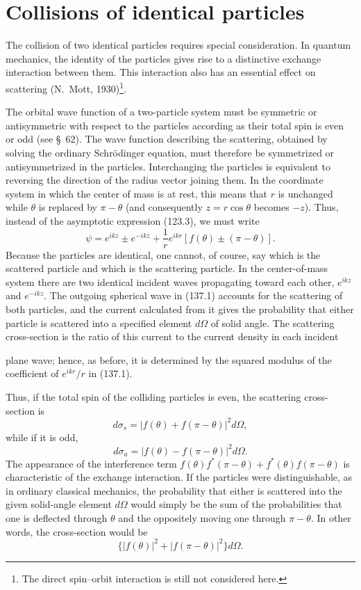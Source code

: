 \section{Collisions of identical particles}

The collision of two identical particles requires special consideration. In
quantum mechanics, the identity of the particles gives rise to a distinctive
exchange interaction between them. This interaction also has an essential
effect on scattering (N.~Mott, 1930)\footnote{The direct spin--orbit
interaction is still not considered here.}.

The orbital wave function of a two-particle system must be symmetric or
antisymmetric with respect to the particles according as their total spin is
even or odd (see \S~62). The wave function describing the scattering, obtained
by solving the ordinary Schrödinger equation, must therefore be symmetrized or
antisymmetrized in the particles. Interchanging the particles is equivalent
to reversing the direction of the radius vector joining them. In the
coordinate system in which the center of mass is at rest, this means that $r$
is unchanged while $\theta$ is replaced by $\pi-\theta$ (and consequently
$z=r\cos\theta$ becomes $-z$). Thus, instead of the asymptotic expression
(123.3), we must write
\begin{equation}
 \psi=e^{ikz}\pm e^{-ikz}+\frac1r e^{ikr}[f(\theta)\pm(\pi-\theta)].
 \tag{137.1}
\end{equation}
Because the particles are identical, one cannot, of course, say which is the
scattered particle and which is the scattering particle. In the center-of-mass
system there are two identical incident waves propagating toward each other,
$e^{ikz}$ and $e^{-ikz}$. The outgoing spherical wave in (137.1) accounts for
the scattering of both particles, and the current calculated from it gives
the probability that either particle is scattered into a specified element
$d\Omega$ of solid angle. The scattering cross-section is the ratio of this
current to the current density in each incident

plane wave; hence, as before, it is determined by the squared modulus of the
coefficient of $e^{ikr}/r$ in (137.1).

Thus, if the total spin of the colliding particles is even, the scattering
cross-section is
\begin{equation}
 d\sigma_s=|f(\theta)+f(\pi-\theta)|^2d\Omega,
 \tag{137.2}
\end{equation}
while if it is odd,
\begin{equation}
 d\sigma_a=|f(\theta)-f(\pi-\theta)|^2d\Omega.
 \tag{137.3}
\end{equation}
The appearance of the interference term
$f(\theta)f^*(\pi-\theta)+f^*(\theta)f(\pi-\theta)$ is characteristic of the
exchange interaction. If the particles were distinguishable, as in ordinary
classical mechanics, the probability that either is scattered into the given
solid-angle element $d\Omega$ would simply be the sum of the probabilities
that one is deflected through $\theta$ and the oppositely moving one through
$\pi-\theta$. In other words, the cross-section would be
\[
 \{|f(\theta)|^2+|f(\pi-\theta)|^2\}d\Omega.
\]

